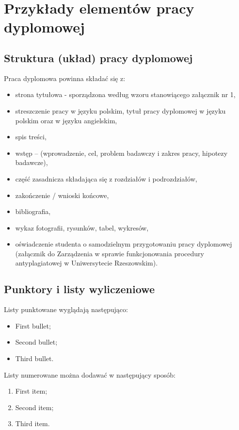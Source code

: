 \chapter{Przykłady elementów pracy dyplomowej}
\label{cha:elementyPracy}
\section{Struktura (układ) pracy dyplomowej}

Praca dyplomowa powinna składać się z:
\begin{itemize}
    \item strona tytułowa - sporządzona według wzoru stanowiącego załącznik nr 1,
    \item streszczenie pracy w języku polskim, tytuł pracy dyplomowej w języku polskim oraz w języku angielskim,
    \item spis treści,
    \item wstęp -- (wprowadzenie, cel, problem badawczy i zakres pracy, hipotezy badawcze),
    \item część zasadnicza składająca się z rozdziałów i podrozdziałów,
    \item zakończenie / wnioski końcowe,
    \item bibliografia,
    \item wykaz fotografii, rysunków, tabel, wykresów,
    \item oświadczenie studenta o samodzielnym przygotowaniu pracy dyplomowej (załącznik do Zarządzenia w sprawie funkcjonowania procedury antyplagiatowej w Uniwersytecie Rzeszowskim).
\end{itemize}

\section{Punktory i listy wyliczeniowe}

Listy punktowane wyglądają następująco:
\begin{itemize}
    \item	First bullet;
    \item	Second bullet;
    \item	Third bullet.
\end{itemize}

Listy numerowane można dodawać w następujący sposób:
\begin{enumerate}
    \item	First item;
    \item	Second item;
    \item	Third item.
\end{enumerate}

